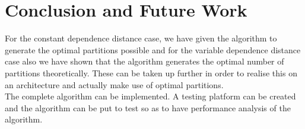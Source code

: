 \chapter{Conclusion and Future Work}

For the constant dependence distance case, we have given the algorithm to generate the optimal partitions possible and for the variable dependence distance case also we have shown that the algorithm generates the optimal number of partitions theoretically. These can be taken up further in order to realise this on an architecture and actually make use of optimal partitions. \\

The complete algorithm can be implemented. A testing platform can be created and the algorithm can be put to test so as to have performance analysis of the algorithm. \\